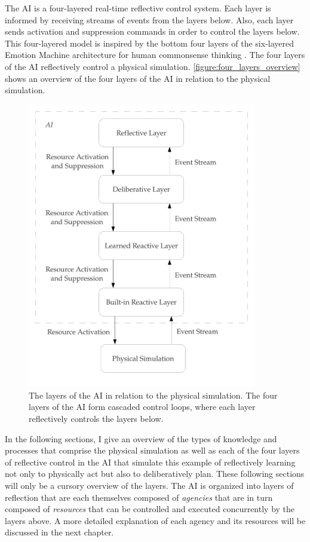 The AI is a four-layered real-time reflective control system.  Each
layer is informed by receiving streams of events from the layers
below.  Also, each layer sends activation and suppression commands in
order to control the layers below.  This four-layered model is
inspired by the bottom four layers of the six-layered Emotion Machine
architecture for human commonsense thinking \cite[]{minsky:2006}.  The
four layers of the AI reflectively control a physical simulation.
{\mbox{\autoref{figure:four_layers_overview}}} shows an overview of
the four layers of the AI in relation to the physical simulation.
\begin{figure}
\begin{center}
\includegraphics[width=10cm]{gfx/four_layers_overview}
\end{center}
\caption[The four layers of the AI in relation to the physical
  simulation.]{The layers of the AI in relation to the physical
  simulation.  The four layers of the AI form cascaded control loops,
  where each layer reflectively controls the layers below.}
\label{figure:four_layers_overview}
\end{figure}

In the following sections, I give an overview of the types of
knowledge and processes that comprise the physical simulation as well
as each of the four layers of reflective control in the AI that
simulate this example of reflectively learning not only to physically
act but also to deliberatively plan.  These following sections will
only be a cursory overview of the layers.  The AI is organized into
layers of reflection that are each themselves composed of
\emph{agencies} that are in turn composed of \emph{resources} that can
be controlled and executed concurrently by the layers above.  A more
detailed explanation of each agency and its resources will be
discussed in the next chapter.


